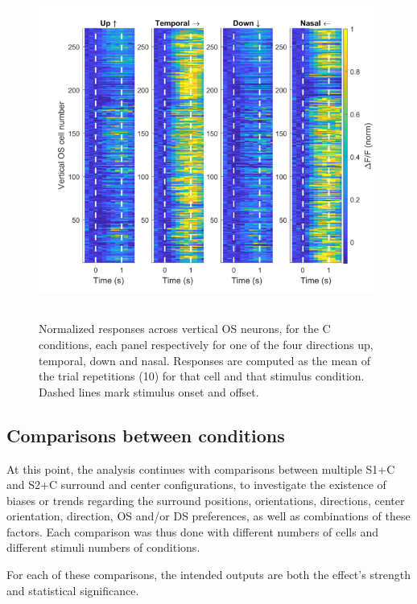 \begin{figure}[H] \centering \includegraphics[width=11cm,height=11cm,keepaspectratio]{Figures/7.Results/finalPopulation/sel/popPlots_vertOS_centerOnly.png} 
\vspace*{-0.2cm}\caption{Normalized responses across vertical OS neurons, for the C conditions, each panel respectively for one of the four directions up, temporal, down and nasal. Responses are computed as the mean of the trial repetitions (10) for that cell and that stimulus condition. Dashed lines mark stimulus onset and offset.} \label{OSvert}
\end{figure}

\subsection{Comparisons between conditions}
\label{sec:comparisons}

At this point, the analysis continues with comparisons between multiple S1+C and S2+C surround and center configurations, to investigate the existence of biases or trends regarding the surround positions, orientations, directions, center orientation, direction, OS and/or DS preferences, as well as combinations of these factors. Each comparison was thus done with different numbers of cells and different stimuli numbers of conditions. 

For each of these comparisons, the intended outputs are both the effect's strength and statistical significance. 

